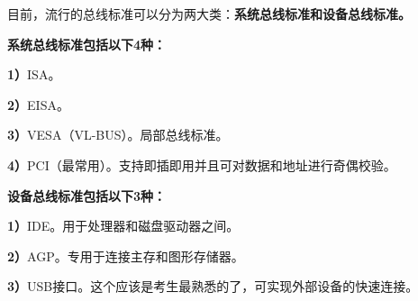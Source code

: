 目前，流行的总线标准可以分为两大类：\textbf{系统总线标准和设备总线标准。}

{\textbf{系统总线标准包括以下4种：}}

\textbf{1）}ISA。

\textbf{2）}EISA。

\textbf{3）}VESA（VL-BUS）。局部总线标准。

\textbf{4）}PCI（最常用）。支持即插即用并且可对数据和地址进行奇偶校验。

{\textbf{设备总线标准包括以下3种：}}

\textbf{1）}IDE。用于处理器和磁盘驱动器之间。

\textbf{2）}AGP。专用于连接主存和图形存储器。

\textbf{3）}USB接口。这个应该是考生最熟悉的了，可实现外部设备的快速连接。\\
